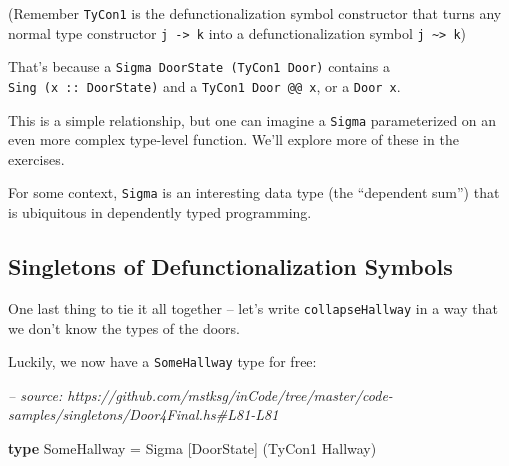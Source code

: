 \documentclass[]{article}
\newenvironment{Shaded}{}{}
\newcommand{\CommentTok}[1]{\textcolor[rgb]{0.38,0.63,0.69}{\textit{#1}}}
\newcommand{\DataTypeTok}[1]{\textcolor[rgb]{0.56,0.13,0.00}{#1}}
\newcommand{\FunctionTok}[1]{\textcolor[rgb]{0.02,0.16,0.49}{#1}}
\newcommand{\KeywordTok}[1]{\textcolor[rgb]{0.00,0.44,0.13}{\textbf{#1}}}
\newcommand{\NormalTok}[1]{#1}
\newcommand{\OtherTok}[1]{\textcolor[rgb]{0.00,0.44,0.13}{#1}}
\begin{document}
\begin{Shaded}
\end{Shaded}

(Remember \texttt{TyCon1} is the defunctionalization symbol constructor that
turns any normal type constructor \texttt{j\ -\textgreater{}\ k} into a
defunctionalization symbol \texttt{j\ \textasciitilde{}\textgreater{}\ k})

That's because a \texttt{Sigma\ DoorState\ (TyCon1\ Door)} contains a
\texttt{Sing\ (x\ ::\ DoorState)} and a \texttt{TyCon1\ Door\ @@\ x}, or a
\texttt{Door\ x}.

This is a simple relationship, but one can imagine a \texttt{Sigma}
parameterized on an even more complex type-level function. We'll explore more of
these in the exercises.

For some context, \texttt{Sigma} is an interesting data type (the ``dependent
sum'') that is ubiquitous in dependently typed programming.

\hypertarget{singletons-of-defunctionalization-symbols}{%
\subsection{Singletons of Defunctionalization
Symbols}\label{singletons-of-defunctionalization-symbols}}

One last thing to tie it all together -- let's write \texttt{collapseHallway} in
a way that we don't know the types of the doors.

Luckily, we now have a \texttt{SomeHallway} type for free:

\begin{Shaded}
\begin{Highlighting}[]
\CommentTok{-- source: https://github.com/mstksg/inCode/tree/master/code-samples/singletons/Door4Final.hs#L81-L81}

\KeywordTok{type} \DataTypeTok{SomeHallway} \FunctionTok{=} \DataTypeTok{Sigma}\NormalTok{ [}\DataTypeTok{DoorState}\NormalTok{] (}\DataTypeTok{TyCon1} \DataTypeTok{Hallway}\NormalTok{)}
\end{Highlighting}
\end{Shaded}
\end{document}
